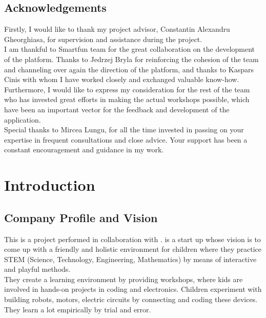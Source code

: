 
\begin{center}\section*{Acknowledgements}
\end{center}
\vspace{1.5 cm}

Firstly, I would like to thank my project advisor, Constantin Alexandru Gheorghiasa, for supervision and assistance during the project. \\

I am thankful to Smartfun team for the great collaboration on the development of the platform. Thanks to Jedrzej Bryla for reinforcing the cohesion of the team and channeling over again the direction of the platform, and thanks to Kaspars Cinis with whom I have worked closely and exchanged valuable know-how. Furthermore, I would like to express my consideration for the rest of the team who has invested great efforts in making the actual workshops possible, which have been an important vector for the feedback and development of the application. \\

Special thanks to Mircea Lungu, for all the time invested in passing on your expertise in frequent consultations and close advice. Your support has been a constant encouragement and guidance in my work. \\ 
	
\chapter{Introduction}

\section{Company Profile and Vision}

This is a project performed in collaboration with \sfun. \sfun is a start up whose vision is to come up with a friendly and holistic environment for children where they practice STEM (Science, Technology, Engineering, Mathematics) by means of interactive and playful methods. \\

They create a learning environment by providing workshops, where kids are involved in hands-on projects in coding and electronics. Children experiment with building robots, motors, electric circuits by connecting and coding these devices. They learn a lot empirically by trial and error.  \\

